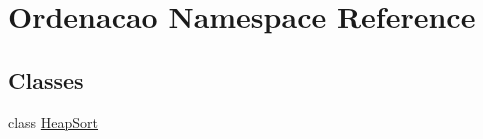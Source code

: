 \hypertarget{namespaceOrdenacao}{
\section{Ordenacao Namespace Reference}
\label{namespaceOrdenacao}
}
\subsection*{Classes}
\begin{DoxyCompactItemize}
\item 
class \hyperlink{classOrdenacao_1_1HeapSort}{HeapSort}
\end{DoxyCompactItemize}
